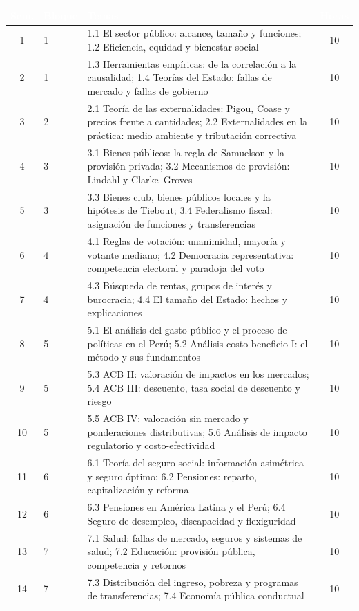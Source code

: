 \documentclass[11pt,a4paper]{article}
\renewcommand{\arraystretch}{1.3}
\newcommand{\cab}[1]{\textcolor{white}{\sffamily\bfseries #1}}
\newcommand{\filasalternas}{\rowcolors{2}{white}{tonoPalido}}
\begin{document}
{\small\filasalternas
\renewcommand{\arraystretch}{1.1}\noindent\begin{tabularx}{\textwidth}{clXc}
\toprule
\rowcolor{tonoOscuro}\cab{Sem.} & \cab{Bloque} & \cab{Temas} & \cab{Horas} \\
\midrule
1  & 1 & 1.1 El sector público: alcance, tamaño y funciones; 1.2 Eficiencia, equidad y bienestar social & 10 \\
2  & 1 & 1.3 Herramientas empíricas: de la correlación a la causalidad; 1.4 Teorías del Estado: fallas de mercado y fallas de gobierno & 10 \\
\midrule
3  & 2 & 2.1 Teoría de las externalidades: Pigou, Coase y precios frente a cantidades; 2.2 Externalidades en la práctica: medio ambiente y tributación correctiva & 10 \\
\midrule
4  & 3 & 3.1 Bienes públicos: la regla de Samuelson y la provisión privada; 3.2 Mecanismos de provisión: Lindahl y Clarke--Groves & 10 \\
5  & 3 & 3.3 Bienes club, bienes públicos locales y la hipótesis de Tiebout; 3.4 Federalismo fiscal: asignación de funciones y transferencias & 10 \\
\midrule
6  & 4 & 4.1 Reglas de votación: unanimidad, mayoría y votante mediano; 4.2 Democracia representativa: competencia electoral y paradoja del voto & 10 \\
7  & 4 & 4.3 Búsqueda de rentas, grupos de interés y burocracia; 4.4 El tamaño del Estado: hechos y explicaciones & 10 \\
\midrule
8  & 5 & 5.1 El análisis del gasto público y el proceso de políticas en el Perú; 5.2 Análisis costo-beneficio I: el método y sus fundamentos & 10 \\
9  & 5 & 5.3 ACB II: valoración de impactos en los mercados; 5.4 ACB III: descuento, tasa social de descuento y riesgo & 10 \\
10 & 5 & 5.5 ACB IV: valoración sin mercado y ponderaciones distributivas; 5.6 Análisis de impacto regulatorio y costo-efectividad & 10 \\
\midrule
11 & 6 & 6.1 Teoría del seguro social: información asimétrica y seguro óptimo; 6.2 Pensiones: reparto, capitalización y reforma & 10 \\
12 & 6 & 6.3 Pensiones en América Latina y el Perú; 6.4 Seguro de desempleo, discapacidad y flexiguridad & 10 \\
\midrule
13 & 7 & 7.1 Salud: fallas de mercado, seguros y sistemas de salud; 7.2 Educación: provisión pública, competencia y retornos & 10 \\
14 & 7 & 7.3 Distribución del ingreso, pobreza y programas de transferencias; 7.4 Economía pública conductual & 10 \\
\bottomrule
\end{tabularx}
}
\end{document}
